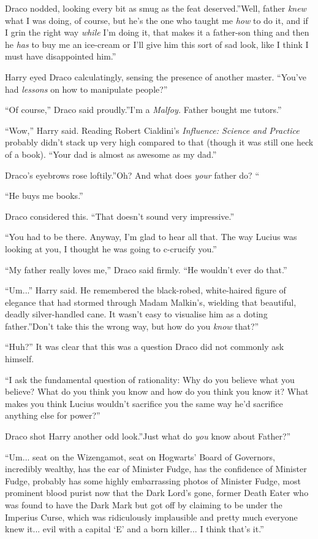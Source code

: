 Draco nodded, looking every bit as smug as the feat deserved.''Well,
father \emph{knew} what I was doing, of course, but he's the one who
taught me \emph{how} to do it, and if I grin the right way \emph{while}
I'm doing it, that makes it a father-son thing and then he \emph{has} to
buy me an ice-cream or I'll give him this sort of sad look, like I think
I must have disappointed him.''

Harry eyed Draco calculatingly, sensing the presence of another master.
``You've had \emph{lessons} on how to manipulate people?''

``Of course,'' Draco said proudly.''I'm a \emph{Malfoy.} Father bought
me tutors.''

``Wow,'' Harry said. Reading Robert Cialdini's \emph{Influence: Science
and Practice} probably didn't stack up very high compared to that
(though it was still one heck of a book). ``Your dad is almost as
awesome as my dad.''

Draco's eyebrows rose loftily.''Oh? And what does \emph{your} father do?
``

``He buys me books.''

Draco considered this. ``That doesn't sound very impressive.''

``You had to be there. Anyway, I'm glad to hear all that. The way Lucius
was looking at you, I thought he was going to c-crucify you.''

``My father really loves me,'' Draco said firmly. ``He wouldn't ever do
that.''

``Um...'' Harry said. He remembered the black-robed, white-haired
figure of elegance that had stormed through Madam Malkin's, wielding
that beautiful, deadly silver-handled cane. It wasn't easy to visualise
him as a doting father.''Don't take this the wrong way, but how do you
\emph{know} that?''

``Huh?'' It was clear that this was a question Draco did not commonly
ask himself.

``I ask the fundamental question of rationality: Why do you believe what
you believe? What do you think you know and how do you think you know
it? What makes you think Lucius wouldn't sacrifice you the same way he'd
sacrifice anything else for power?''

Draco shot Harry another odd look.''Just what do \emph{you} know about
Father?''

``Um... seat on the Wizengamot, seat on Hogwarts' Board of
Governors, incredibly wealthy, has the ear of Minister Fudge, has the
confidence of Minister Fudge, probably has some highly embarrassing
photos of Minister Fudge, most prominent blood purist now that the Dark
Lord's gone, former Death Eater who was found to have the Dark Mark but
got off by claiming to be under the Imperius Curse, which was
ridiculously implausible and pretty much everyone knew it... evil
with a capital `E' and a born killer... I think that's it.''

